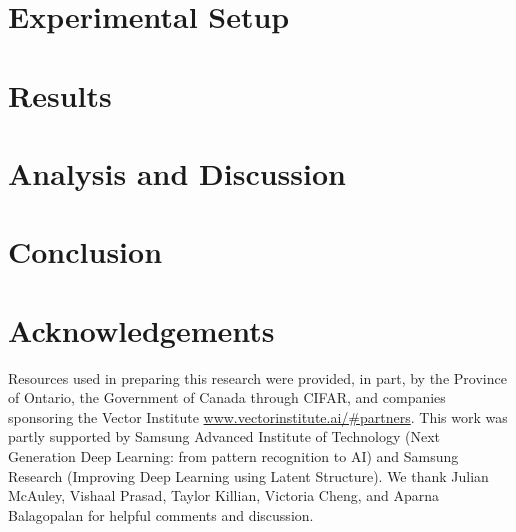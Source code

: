 \documentclass[11pt,a4paper]{article}
\begin{document}
\section{Experimental Setup}
\label{sec:experiments}


\section{Results}
\label{sec:results}


\section{Analysis and Discussion}
\label{sec:discussion}


\section{Conclusion}
\label{sec:conclusion}


\section*{Acknowledgements}
Resources used in preparing this research were provided, in part, by the Province of Ontario, the Government of Canada through CIFAR, and companies sponsoring the Vector Institute \url{www.vectorinstitute.ai/#partners}.
This work was partly supported by Samsung Advanced Institute of Technology (Next Generation Deep Learning: from pattern recognition to AI) and Samsung Research (Improving Deep Learning using Latent Structure).
We thank Julian McAuley, Vishaal Prasad, Taylor Killian, Victoria Cheng, and Aparna Balagopalan for helpful comments and discussion.




\clearpage
\appendix

\end{document}
